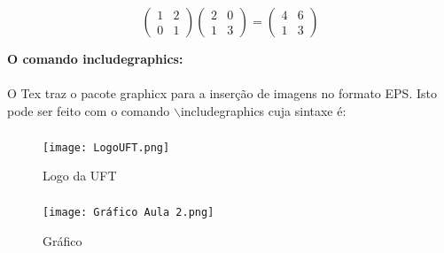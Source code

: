 \documentclass[a4paper, 12pt]{article} %
\begin{document}
\[ \left(\begin{array}{cc}
1 & 2 \\ 0 & 1
\end{array}\right)
\left(\begin{array}{cc}
2 & 0 \\ 1 & 3
\end{array}\right)
=
\left(\begin{array}{cc}
4 & 6 \\ 1 & 3
\end{array}\right) \]

\begin{flushleft}
\textbf{O comando includegraphics:}
\end{flushleft}

\paragraph{}
O Tex  traz o pacote graphicx para a inserção de imagens no formato EPS. Isto pode ser feito com o comando $\backslash$includegraphics cuja sintaxe é:


\subparagraph{}
\begin{figure}[h]
\begin{center}
\texttt{[image: LogoUFT.png]}
\end{center}
\caption{Logo da UFT}\label{fig:02}
\end{figure}


\subparagraph{}
\begin{figure}[h]
\begin{center}
\texttt{[image: Gráfico Aula 2.png]}
\end{center}
\caption{Gráfico}\label{fig:02}
\end{figure}
\end{document}

